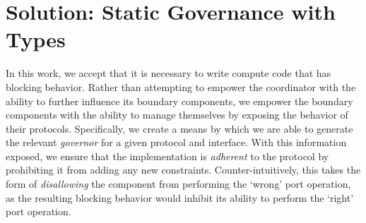 %
%

\section{Solution: Static Governance with Types}
\label{sec:soluition_static_governance}
In this work, we accept that it is necessary to write compute code that has blocking behavior. Rather than attempting to empower the coordinator with the ability to further influence its boundary components, we empower the boundary components with the ability to manage themselves by exposing the behavior of their protocols. Specifically, we create a means by which we are able to generate the relevant \textit{governor} for a given protocol and interface. With this information exposed, we ensure that the implementation is \textit{adherent} to the protocol by prohibiting it from adding any new constraints. Counter-intuitively, this takes the form of \textit{disallowing} the component from performing the `wrong' port operation, as the resulting blocking behavior would inhibit its ability to perform the `right' port operation.

